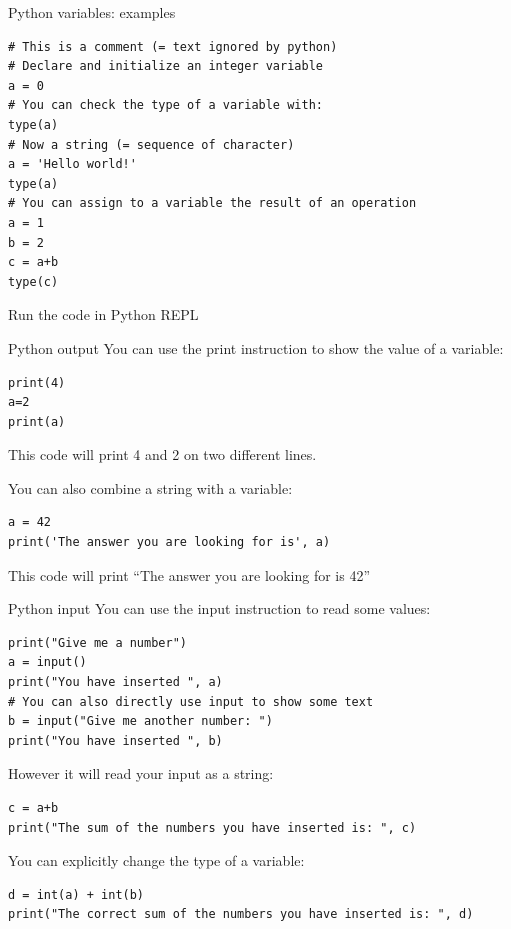 \documentclass[aspectratio=169,]{beamer}
\begin{document}
\begin{frame}[fragile]{Python variables: examples}
    \begin{verbatim}
# This is a comment (= text ignored by python)
# Declare and initialize an integer variable
a = 0
# You can check the type of a variable with:
type(a)
# Now a string (= sequence of character)
a = 'Hello world!'
type(a)
# You can assign to a variable the result of an operation
a = 1
b = 2
c = a+b
type(c)
    \end{verbatim}
Run the code in Python REPL
\end{frame}

\begin{frame}[fragile]{Python output}
    You can use the \alert{print} instruction to show the value of a variable:
    \begin{verbatim}
print(4)
a=2
print(a)
    \end{verbatim}
    This code will print 4 and 2 on two different lines.

    You can also combine a string with a variable:
    \begin{verbatim}
a = 42
print('The answer you are looking for is', a)
    \end{verbatim}
    This code will print ``The answer you are looking for is 42''
\end{frame}

\begin{frame}[fragile]{Python input}
    You can use the \alert{input} instruction to read some values:
    \begin{verbatim}
print("Give me a number")
a = input()
print("You have inserted ", a)
# You can also directly use input to show some text
b = input("Give me another number: ")
print("You have inserted ", b)
    \end{verbatim}

    However it will read your input as a string:
    \begin{verbatim}
c = a+b
print("The sum of the numbers you have inserted is: ", c)
    \end{verbatim}

    You can explicitly change the type of a variable:
    \begin{verbatim}
d = int(a) + int(b)
print("The correct sum of the numbers you have inserted is: ", d)
    \end{verbatim}
\end{frame}
\end{document}
